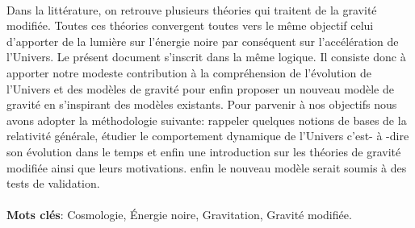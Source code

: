\documentclass[a4paper,12pt]{report}
\theoremstyle{plain}
\theoremstyle{plain}
\begin{document}
\paragraph{} Dans la littérature, on retrouve plusieurs  théories qui traitent de la gravité modifiée. Toutes ces théories convergent toutes vers le même objectif celui d'apporter de la lumière sur l'énergie noire par conséquent sur l'accélération de l'Univers. Le présent document s'inscrit dans la même logique. Il consiste donc à apporter notre modeste contribution à la compréhension de l'évolution de l'Univers et des modèles de gravité pour enfin proposer  un nouveau modèle de gravité en s'inspirant des modèles existants. Pour parvenir à nos objectifs nous avons adopter la méthodologie suivante:  rappeler quelques notions de bases de la relativité générale, étudier le comportement dynamique de l'Univers c'est- à -dire son évolution dans le temps et enfin  une introduction sur les théories de gravité modifiée ainsi que leurs motivations. enfin le nouveau modèle serait soumis à des tests de validation.





\paragraph{}
\textbf{Mots clés}: Cosmologie, Énergie noire, Gravitation, Gravité modifiée.
\end{document}
